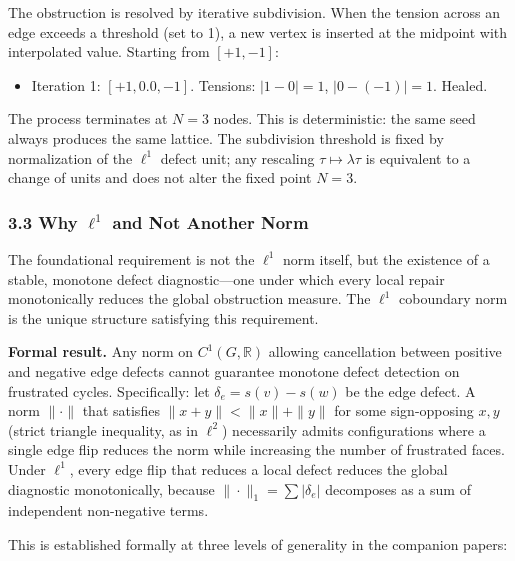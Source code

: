 \documentclass[
]{article}
\providecommand{\tightlist}{%
  \setlength{\itemsep}{0pt}\setlength{\parskip}{0pt}}
\begin{document}
The obstruction is resolved by iterative subdivision. When the tension
across an edge exceeds a threshold (set to 1), a new vertex is inserted
at the midpoint with interpolated value. Starting from \([+1, -1]\):

\begin{itemize}
\tightlist
\item
  Iteration 1: \([+1, 0.0, -1]\). Tensions: \(|1 - 0| = 1\),
  \(|0 - (-1)| = 1\). Healed.
\end{itemize}

The process terminates at \(N = 3\) nodes. This is deterministic: the
same seed always produces the same lattice. The subdivision threshold is
fixed by normalization of the \(\ell^1\) defect unit; any rescaling
\(\tau \mapsto \lambda\tau\) is equivalent to a change of units and does
not alter the fixed point \(N = 3\).

\hypertarget{why-ell1-and-not-another-norm}{%
\subsubsection{\texorpdfstring{3.3 Why \(\ell^1\) and Not Another
Norm}{3.3 Why \textbackslash ell\^{}1 and Not Another Norm}}\label{why-ell1-and-not-another-norm}}

The foundational requirement is not the \(\ell^1\) norm itself, but the
existence of a stable, monotone defect diagnostic---one under which
every local repair monotonically reduces the global obstruction measure.
The \(\ell^1\) coboundary norm is the unique structure satisfying this
requirement.

\textbf{Formal result.} Any norm on \(C^1(G, \mathbb{R})\) allowing
cancellation between positive and negative edge defects cannot guarantee
monotone defect detection on frustrated cycles. Specifically: let
\(\delta_e = s(v) - s(w)\) be the edge defect. A norm \(\|\cdot\|\) that
satisfies \(\|x + y\| < \|x\| + \|y\|\) for some sign-opposing \(x, y\)
(strict triangle inequality, as in \(\ell^2\)) necessarily admits
configurations where a single edge flip reduces the norm while
increasing the number of frustrated faces. Under \(\ell^1\), every edge
flip that reduces a local defect reduces the global diagnostic
monotonically, because \(\|\cdot\|_1 = \sum |\delta_e|\) decomposes as a
sum of independent non-negative terms.

This is established formally at three levels of generality in the
companion papers:
\end{document}
